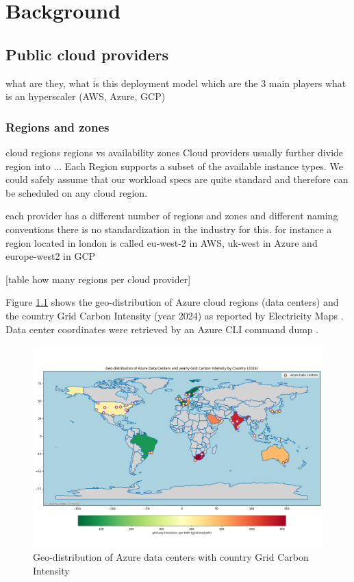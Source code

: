 \chapter{Background}
\label{cha:background}

\section{Public cloud providers}

what are they, what is this deployment model
which are the 3 main players
what is an hyperscaler (AWS, Azure, GCP)

\subsection{Regions and zones}
cloud regions
regions vs availability zones
Cloud providers usually further divide region into ...
Each Region supports a subset of the available instance types.
We could safely assume that our workload specs are quite standard and therefore can be scheduled on any cloud region.

each provider has a different number of regions and zones and different naming conventions
there is no standardization in the industry for this. 
for instance a region located in london is called eu-west-2 in AWS, uk-west in Azure and europe-west2 in GCP

[table how many regions per cloud provider]

Figure \ref{fig:azure_data_centers} shows the geo-distribution of Azure cloud regions (data centers) and the country Grid Carbon Intensity (year 2024) as reported by Electricity Maps \cite{electricity_maps}. Data center coordinates were retrieved by an Azure CLI command dump \cite{azure_data_centers_information}.

\begin{figure}[htb]
    \centering
    \includegraphics[width=1\linewidth]{images/azure_data_centers.png}
    \caption{Geo-distribution of Azure data centers with country Grid Carbon Intensity}
    \label{fig:azure_data_centers}
\end{figure}

